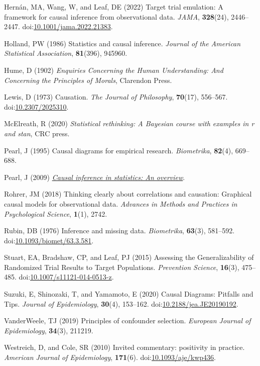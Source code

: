 \documentclass[
  singlecolumn]{article}
\newlength{\cslhangindent}
\newenvironment{CSLReferences}[2] %
 {\begin{list}{}{%
  \setlength{\itemindent}{0pt}
  \setlength{\leftmargin}{0pt}
  \setlength{\parsep}{0pt}
  \ifodd #1
   \setlength{\leftmargin}{\cslhangindent}
   \setlength{\itemindent}{-1\cslhangindent}
  \fi
  \setlength{\itemsep}{#2\baselineskip}}}
 {\end{list}}
\begin{document}
\begin{CSLReferences}{1}{0}
Hernán, MA, Wang, W, and Leaf, DE (2022) Target trial emulation: A
framework for causal inference from observational data. \emph{JAMA},
\textbf{328}(24), 2446--2447.
doi:\href{https://doi.org/10.1001/jama.2022.21383}{10.1001/jama.2022.21383}.

Holland, PW (1986) Statistics and causal inference. \emph{Journal of the
American Statistical Association}, \textbf{81}(396), 945960.

Hume, D (1902) \emph{Enquiries Concerning the Human Understanding: And
Concerning the Principles of Morals}, Clarendon Press.

Lewis, D (1973) Causation. \emph{The Journal of Philosophy},
\textbf{70}(17), 556--567.
doi:\href{https://doi.org/10.2307/2025310}{10.2307/2025310}.

McElreath, R (2020) \emph{Statistical rethinking: A {B}ayesian course
with examples in r and stan}, CRC press.

Pearl, J (1995) Causal diagrams for empirical research.
\emph{Biometrika}, \textbf{82}(4), 669--688.

Pearl, J (2009) \emph{\href{https://doi.org/10.1214/09-SS057}{Causal
inference in statistics: An overview}}.

Rohrer, JM (2018) Thinking clearly about correlations and causation:
Graphical causal models for observational data. \emph{Advances in
Methods and Practices in Psychological Science}, \textbf{1}(1), 2742.

Rubin, DB (1976) Inference and missing data. \emph{Biometrika},
\textbf{63}(3), 581--592.
doi:\href{https://doi.org/10.1093/biomet/63.3.581}{10.1093/biomet/63.3.581}.

Stuart, EA, Bradshaw, CP, and Leaf, PJ (2015) Assessing the
Generalizability of Randomized Trial Results to Target Populations.
\emph{Prevention Science}, \textbf{16}(3), 475--485.
doi:\href{https://doi.org/10.1007/s11121-014-0513-z}{10.1007/s11121-014-0513-z}.

Suzuki, E, Shinozaki, T, and Yamamoto, E (2020) Causal Diagrams:
Pitfalls and Tips. \emph{Journal of Epidemiology}, \textbf{30}(4),
153--162.
doi:\href{https://doi.org/10.2188/jea.JE20190192}{10.2188/jea.JE20190192}.

VanderWeele, TJ (2019) Principles of confounder selection.
\emph{European Journal of Epidemiology}, \textbf{34}(3), 211219.

Westreich, D, and Cole, SR (2010) Invited commentary: positivity in
practice. \emph{American Journal of Epidemiology}, \textbf{171}(6).
doi:\href{https://doi.org/10.1093/aje/kwp436}{10.1093/aje/kwp436}.

\end{CSLReferences}
\end{document}
